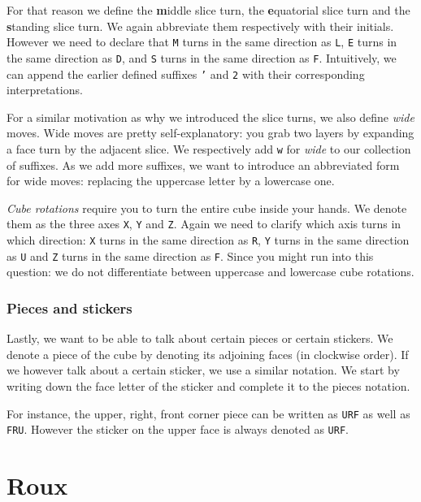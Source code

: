 \documentclass[a4paper]{scrreprt}
\begin{document}
For that reason we define the \textbf{m}iddle slice turn, the \textbf{e}quatorial slice turn and the \textbf{s}tanding slice turn. We again abbreviate them respectively with their initials. However we need to declare that \texttt{M} turns in the same direction as \texttt{L}, \texttt{E} turns in the same direction as \texttt{D}, and \texttt{S} turns in the same direction as \texttt{F}. Intuitively, we can append the earlier defined suffixes \texttt{'} and \texttt{2} with their corresponding interpretations.\par

For a similar motivation as why we introduced the slice turns, we also define \emph{wide} moves. Wide moves are pretty self-explanatory: you grab two layers by expanding a face turn by the adjacent slice. We respectively add \texttt{w} for \emph{wide} to our collection of suffixes. As we add more suffixes, we want to introduce an abbreviated form for wide moves: replacing the uppercase letter by a lowercase one.\par

\emph{Cube rotations} require you to turn the entire cube inside your hands. We denote them as the three axes \texttt{X}, \texttt{Y} and \texttt{Z}. Again we need to clarify which axis turns in which direction: \texttt{X} turns in the same direction as \texttt{R}, \texttt{Y} turns in the same direction as \texttt{U} and \texttt{Z} turns in the same direction as \texttt{F}. Since you might run into this question: we do not differentiate between uppercase and lowercase cube rotations.

\subsection{Pieces and stickers}%
Lastly, we want to be able to talk about certain pieces or certain stickers. We denote a piece of the cube by denoting its adjoining faces (in clockwise order). If we however talk about a certain sticker, we use a similar notation. We start by writing down the face letter of the sticker and complete it to the pieces notation.\par

For instance, the upper, right, front corner piece can be written as \texttt{URF} as well as \texttt{FRU}. However the sticker on the upper face is always denoted as \texttt{URF}.

\chapter{Roux}
\end{document}

